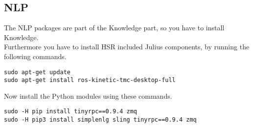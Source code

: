 \documentclass[main.tex]{subfiles}
\begin{document}
\subsection{NLP}
The NLP packages are part of the Knowledge part, so you have to install Knowledge.\\
Furthermore you have to install HSR included Julius components, by running the following commands.\\
\begin{lstlisting}
sudo apt-get update
sudo apt-get install ros-kinetic-tmc-desktop-full 
\end{lstlisting}
Now install the Python modules using these commands.\\
\begin{lstlisting}
sudo -H pip install tinyrpc==0.9.4 zmq
sudo -H pip3 install simplenlg sling tinyrpc==0.9.4 zmq 
\end{lstlisting}
	
\end{document}
